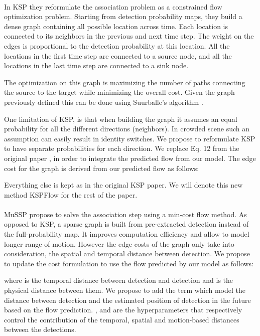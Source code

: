 \documentclass[10pt,twocolumn,letterpaper]{article}
\begin{document}
\paragraph*{}
In KSP\cite{Berclaz11} they reformulate the association problem as a constrained flow optimization problem.
Starting from detection probability maps, they build a dense graph containing all possible location across time.
Each location is connected to its neighbors in the previous and next time step. 
The weight on the edges is proportional to the detection probability at this location.
All the locations in the first time step are connected to a source node, and all the locations in the last time step are connected to a sink node.

The optimization on this graph is maximizing the number of paths connecting the source to the target while minimizing the overall cost.
Given the graph previously defined this can be done using Suurballe's algorithm \cite{Suurballe74}.

One limitation of KSP, is that when building the graph it assumes an equal probability for all the different directions (neighbors).
In crowded scene such an assumption can easily result in identity switches.
We propose to reformulate KSP to have separate probabilities for each direction. We replace Eq. 12 from the original paper \cite{Berclaz11}, 
in order to integrate the predicted flow from our model.
The edge cost for the graph is derived from our predicted flow as follows:


Everything else is kept as in the original KSP paper. We will denote this new method KSPFlow for the rest of the paper.

\paragraph*{}
MuSSP\cite{Wang19f} propose to solve the association step using a min-cost flow method.
As opposed to KSP, a sparse graph is built from pre-extracted detection instead of the full-probability map. It improves computation efficiency 
and allow to model longer range of motion. However the edge costs of the graph only take into consideration, the spatial and temporal distance between detection.
We propose to update the cost formulation to use the flow predicted by our model as follows:

where  is the temporal distance between detection  and detection  and  is the physical distance between them.
We propose to add the term  which model the distance between detection  and the estimated position of detection 
 in the future based on the flow prediction. ,  and  are the hyperparameters that respectively control the contribution of the temporal, 
spatial and motion-based distances between the detections.
  
\end{document}
